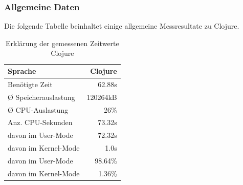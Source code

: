 \documentclass{fancydocument}
\begin{document}
\subsubsection{Allgemeine Daten}
Die folgende Tabelle beinhaltet einige allgemeine Messresultate zu Clojure. 
\begin{table}[h!]
\centering
\begin{tabular}{|p{6cm}|r|} \hline
Sprache & Clojure\\
\hline
Benötigte Zeit & 62.88s\\
\hline
Ø Speicherauslastung & 120264kB\\
\hline
Ø CPU-Auslastung & 26\%\\
\hline
Anz. CPU-Sekunden & 73.32s\\
\hline
davon im User-Mode & 72.32s\\
\hline
davon im Kernel-Mode & 1.0s\\
\hline
davon im User-Mode & 98.64\%\\
\hline
davon im Kernel-Mode & 1.36\%\\
\hline
\end{tabular}
\caption{Erklärung der gemessenen Zeitwerte Clojure}
\end{table}
\end{document}
